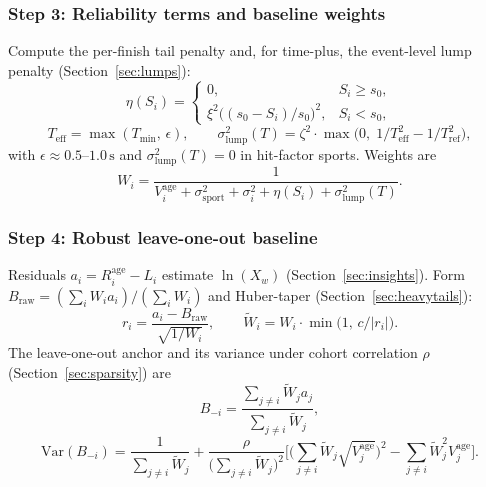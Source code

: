 \documentclass[12pt]{article}
\newcommand{\sigmai}{\sigma_i^2}
\newcommand{\ssport}{\sigma_{\mathrm{sport}}^2}      %
\newcommand{\xii}{\xi^2}
\newcommand{\zetai}{\zeta^2}                    %
\newcommand{\slump}{\sigma_{\mathrm{lump}}^2}  %
\newcommand{\tref}{T_{\mathrm{ref}}}
\newcommand{\rhoc}{\rho}        %
\newcommand{\cthresh}{c}        %
\newcommand{\szero}{s_0}
\newcommand{\xwin}{X_w}
\newcommand{\tmin}{T_{\mathrm{min}}}
\begin{document}
	\subsubsection*{Step 3: Reliability terms and baseline weights}
	Compute the per-finish tail penalty and, for time-plus, the event-level lump penalty (Section~\ref{sec:lumps}):
	\begin{equation}
		\eta(S_i) =
		\begin{cases}
			0, & S_i \ge \szero, \\
			\xii \bigl((\szero - S_i)/\szero\bigr)^2, & S_i < \szero,
		\end{cases}
	\end{equation}
	\begin{equation}
		T_{\mathrm{eff}} = \max(\tmin,\, \epsilon), \qquad
		\slump(T) = \zetai \cdot \max\!\bigl(0,\; 1/T_{\mathrm{eff}}^2 - 1/\tref^2\bigr),
	\end{equation}
	with $\epsilon \approx 0.5$--$1.0\,\mathrm{s}$ and $\slump(T) = 0$ in hit-factor sports. Weights are
	\begin{equation}
		W_i = \frac{1}{V_i^{\mathrm{age}} + \ssport + \sigmai + \eta(S_i) + \slump(T)}.
	\end{equation}

	\subsubsection*{Step 4: Robust leave-one-out baseline}
	Residuals $a_i = R_i^{\mathrm{age}} - L_i$ estimate $\ln(\xwin)$ (Section~\ref{sec:insights}). Form $B_{\mathrm{raw}} = (\sum_i W_i a_i)/(\sum_i W_i)$ and Huber-taper (Section~\ref{sec:heavytails}):
	\begin{equation}
		r_i = \frac{a_i - B_{\mathrm{raw}}}{\sqrt{1/W_i}}, \qquad
		\tilde{W}_i = W_i \cdot \min\!\bigl(1,\, \cthresh / |r_i|\bigr).
	\end{equation}
	The leave-one-out anchor and its variance under cohort correlation $\rhoc$ (Section~\ref{sec:sparsity}) are
	\begin{equation}
		B_{-i} = \frac{\sum_{j \neq i} \tilde{W}_j a_j}{\sum_{j \neq i} \tilde{W}_j},
	\end{equation}
	\begin{equation}
		\mathrm{Var}(B_{-i}) = \frac{1}{\sum_{j \neq i} \tilde{W}_j} + \frac{\rhoc}{\bigl(\sum_{j \neq i} \tilde{W}_j\bigr)^2} \Biggl[ \Biggl( \sum_{j \neq i} \tilde{W}_j \sqrt{V_j^{\mathrm{age}}} \Biggr)^2 - \sum_{j \neq i} \tilde{W}_j^2 V_j^{\mathrm{age}} \Biggr].
	\end{equation}
\end{document}
